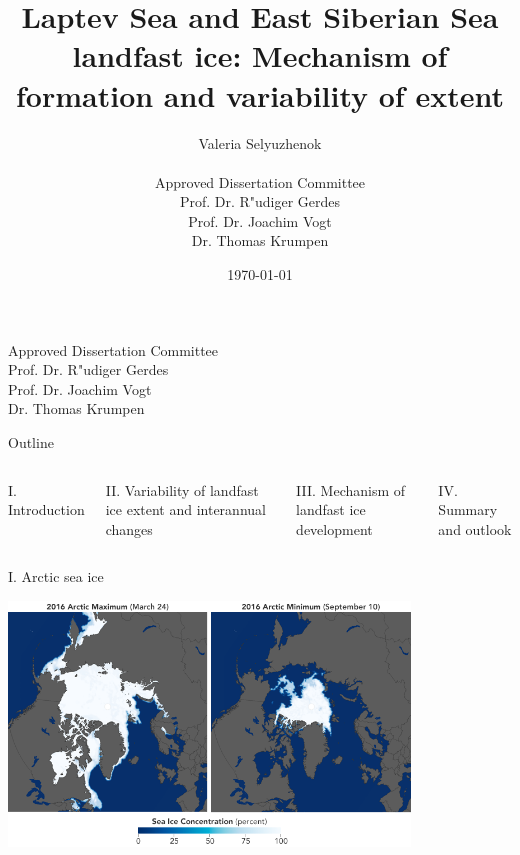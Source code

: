 \documentclass[8pt]{beamer}
\title{Laptev Sea and East Siberian Sea landfast ice: Mechanism of formation and variability of extent}
\date{\today}
\author{Valeria Selyuzhenok\\~\\\textsf {Approved Dissertation Committee}\\
	\textsf{Prof. Dr. R"udiger Gerdes}\\ 
	\textsf{Prof. Dr. Joachim Vogt}\\ 	
	\textsf{Dr. Thomas Krumpen}\\ }
\institute{Jacobs University Bremen}
\begin{document}
\maketitle
{}
\begin{flushright}
		\textsf {Approved Dissertation Committee}\\[0.4cm]	
		\textsf{Prof. Dr. R"udiger Gerdes}\\ 
		\textsf{Prof. Dr. Joachim Vogt}\\ 	
		\textsf{Dr. Thomas Krumpen}\\ 
\end{flushright}
	
\setwatermark{\fontsize{125pt}{125pt}\selectfont{}}
\begin{frame}{Outline}
	\begin{columns}
		\begin{block}{I. Introduction}
		\end{block}
		\begin{block}{II. Variability of landfast ice extent and interannual changes}
		\end{block}
		\begin{block}{III. Mechanism of landfast ice development}
		\end{block}
		\begin{block}{IV. Summary and outlook} 
		\end{block}
	\end{columns}
\end{frame}

\setwatermark{\fontsize{125pt}{125pt}\selectfont{}}
\begin{frame}[fragile]{I. Arctic sea ice}
	\begin{center}
	\includegraphics[width=0.8\textwidth]{./img/arctic_min_max_map.png}
	\end{center}
\end{frame}
	
\end{document}
